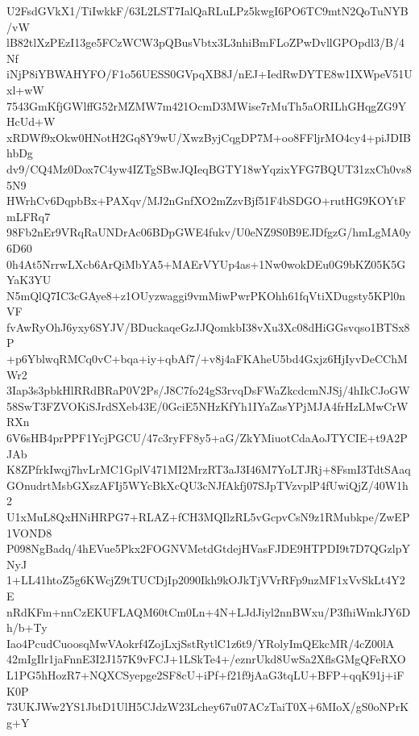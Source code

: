 U2FsdGVkX1/TiIwkkF/63L2LST7IalQaRLuLPz5kwgI6PO6TC9mtN2QoTuNYB/vW
lB82tlXzPEzI13ge5FCzWCW3pQBusVbtx3L3nhiBmFLoZPwDvllGPOpdl3/B/4Nf
iNjP8iYBWAHYFO/F1o56UESS0GVpqXB8J/nEJ+IedRwDYTE8w1IXWpeV51Uxl+wW
7543GmKfjGWlffG52rMZMW7m421OcmD3MWise7rMuTh5aORILhGHqgZG9YHcUd+W
xRDWf9xOkw0HNotH2Gq8Y9wU/XwzByjCqgDP7M+oo8FFljrMO4cy4+piJDIBhbDg
dv9/CQ4Mz0Dox7C4yw4IZTgSBwJQIeqBGTY18wYqzixYFG7BQUT31zxCh0vs85N9
HWrhCv6DqpbBx+PAXqv/MJ2nGnfXO2mZzvBjf51F4bSDGO+rutHG9KOYtFmLFRq7
98Fb2nEr9VRqRaUNDrAc06BDpGWE4fukv/U0eNZ9S0B9EJDfgzG/hmLgMA0y6D60
0h4At5NrrwLXcb6ArQiMbYA5+MAErVYUp4as+1Nw0wokDEu0G9bKZ05K5GYaK3YU
N5mQlQ7IC3cGAye8+z1OUyzwaggi9vmMiwPwrPKOhh61fqVtiXDugsty5KPl0nVF
fvAwRyOhJ6yxy6SYJV/BDuckaqeGzJJQomkbI38vXu3Xc08dHiGGsvqso1BTSx8P
+p6YblwqRMCq0vC+bqa+iy+qbAf7/+v8j4aFKAheU5bd4Gxjz6HjIyvDeCChMWr2
3Iap3s3pbkHlRRdBRaP0V2Ps/J8C7fo24gS3rvqDsFWaZkcdcmNJSj/4hIkCJoGW
58SwT3FZVOKiSJrdSXeb43E/0GciE5NHzKfYh1IYaZasYPjMJA4frHzLMwCrWRXn
6V6sHB4prPPF1YcjPGCU/47c3ryFF8y5+aG/ZkYMiuotCdaAoJTYCIE+t9A2PJAb
K8ZPfrkIwqj7hvLrMC1GplV471MI2MrzRT3aJ3I46M7YoLTJRj+8FsmI3TdtSAaq
GOnudrtMsbGXszAFIj5WYcBkXcQU3cNJfAkfj07SJpTVzvplP4fUwiQjZ/40W1h2
U1xMuL8QxHNiHRPG7+RLAZ+fCH3MQIlzRL5vGcpvCsN9z1RMubkpe/ZwEP1VOND8
P098NgBadq/4hEVue5Pkx2FOGNVMetdGtdejHVasFJDE9HTPDI9t7D7QGzlpYNyJ
1+LL41htoZ5g6KWcjZ9tTUCDjIp2090Ikh9kOJkTjVVrRFp9nzMF1xVvSkLt4Y2E
nRdKFm+nnCzEKUFLAQM60tCm0Ln+4N+LJdJiyl2nnBWxu/P3fhiWmkJY6Dh/b+Ty
Iao4PcudCuoosqMwVAokrf4ZojLxjSstRytlC1z6t9/YRolyImQEkcMR/4cZ00lA
42mIgIlr1jaFnnE3I2J157K9vFCJ+1LSkTe4+/eznrUkd8UwSa2XflsGMgQFeRXO
L1PG5hHozR7+NQXCSyepge2SF8cU+iPf+f21f9jAaG3tqLU+BFP+qqK91j+iFK0P
73UKJWw2YS1JbtD1UlH5CJdzW23Lchey67u07ACzTaiT0X+6MIoX/gS0oNPrKg+Y
